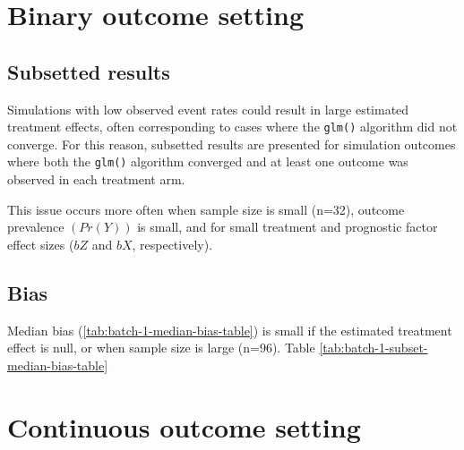 \section{Binary outcome setting}
\subsection{Subsetted results}
Simulations with low observed event rates could result in large estimated treatment effects, often corresponding to cases where the \texttt{glm()} algorithm did not converge.
For this reason, subsetted results are presented for simulation outcomes where both the \texttt{glm()} algorithm converged and at least one outcome was observed in each treatment arm.

This issue occurs more often when sample size is small (n=32), outcome prevalence $(Pr(Y))$ is small, and for small treatment and prognostic factor effect sizes ($bZ$ and $bX$, respectively).

\subsection{Bias}
Median bias (\ref{tab:batch-1-median-bias-table}) is small if the estimated treatment effect is null, or when sample size is large (n=96).
Table \ref{tab:batch-1-subset-median-bias-table}


\section{Continuous outcome setting}